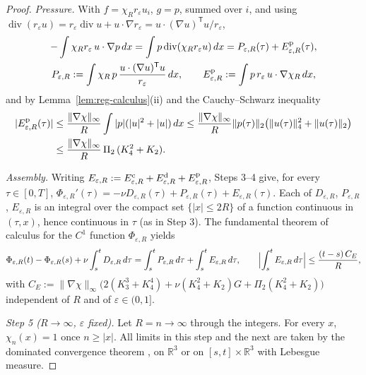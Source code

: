 \documentclass[11pt]{article}
\theoremstyle{definition}
\theoremstyle{plain}
\newcommand{\R}{\mathbb R}
\newcommand{\norm}[1]{\lVert #1\rVert}
\begin{document}
\begin{proof}
\emph{Pressure.}  With $f=\chi_Rr_\varepsilon u_i$, $g=p$, summed over $i$,
and using $\operatorname{div}(r_\varepsilon u)=r_\varepsilon\operatorname{div}u
+u\cdot\nabla r_\varepsilon=u\cdot(\nabla u)^{\mathsf T}u/r_\varepsilon$,
\[
\begin{gathered}
 -\int\chi_Rr_\varepsilon\,u\cdot\nabla p\,dx
 =\int p\operatorname{div}(\chi_Rr_\varepsilon u)\,dx
 =P_{\varepsilon,R}(\tau)+E^{\rm p}_{\varepsilon,R}(\tau),\\
 P_{\varepsilon,R}:=\int\chi_R\,p\,\frac{u\cdot(\nabla u)^{\mathsf T}u}{r_\varepsilon}\,dx,
 \qquad
 E^{\rm p}_{\varepsilon,R}:=\int p\,r_\varepsilon\,u\cdot\nabla\chi_R\,dx,
\end{gathered}
\]
and by Lemma~\ref{lem:reg-calculus}(ii) and the Cauchy--Schwarz inequality
\[
\begin{aligned}
 |E^{\rm p}_{\varepsilon,R}(\tau)|
 &\leq\frac{\norm{\nabla\chi}_\infty}{R}\int|p|(|u|^2+|u|)\,dx
 \leq\frac{\norm{\nabla\chi}_\infty}{R}\norm{p(\tau)}_2
 \bigl(\norm{u(\tau)}_4^2+\norm{u(\tau)}_2\bigr)\\
 &\leq\frac{\norm{\nabla\chi}_\infty}{R}\,\Pi_2\,(K_4^2+K_2).
\end{aligned}
\]

\emph{Assembly.}  Writing
$E_{\varepsilon,R}:=E^{\rm c}_{\varepsilon,R}+E^{\rm d}_{\varepsilon,R}+E^{\rm p}_{\varepsilon,R}$,
Steps 3--4 give, for every $\tau\in[0,T]$,
$\Phi_{\varepsilon,R}'(\tau)=-\nu D_{\varepsilon,R}(\tau)+P_{\varepsilon,R}(\tau)+E_{\varepsilon,R}(\tau)$.
Each of $D_{\varepsilon,R}$, $P_{\varepsilon,R}$, $E_{\varepsilon,R}$ is an
integral over the compact set $\{|x|\leq2R\}$ of a function continuous in
$(\tau,x)$, hence continuous in $\tau$ (as in Step 3).  The fundamental
theorem of calculus \cite[Ch.~7]{Rudin1987} for the $C^1$ function
$\Phi_{\varepsilon,R}$ yields
\begin{equation}\label{eq:cutoff-identity}
 \Phi_{\varepsilon,R}(t)-\Phi_{\varepsilon,R}(s)
 +\nu\int_s^tD_{\varepsilon,R}\,d\tau
 =\int_s^tP_{\varepsilon,R}\,d\tau+\int_s^tE_{\varepsilon,R}\,d\tau,
 \qquad
 \Bigl|\int_s^tE_{\varepsilon,R}\,d\tau\Bigr|\leq\frac{(t-s)\,C_E}{R},
\end{equation}
with $C_E:=\norm{\nabla\chi}_\infty\bigl(2(K_3^3+K_4^4)+\nu(K_4^2+K_2)G+\Pi_2(K_4^2+K_2)\bigr)$
independent of $R$ and of $\varepsilon\in(0,1]$.

\emph{Step 5 ($R\to\infty$, $\varepsilon$ fixed).}  Let $R=n\to\infty$
through the integers.  For every $x$, $\chi_n(x)=1$ once $n\geq|x|$.  All
limits in this step and the next are taken by the dominated convergence
theorem \cite[Ch.~1]{Rudin1987}, on $\R^3$ or on $[s,t]\times\R^3$ with
Lebesgue measure.


\end{proof}
\end{document}
